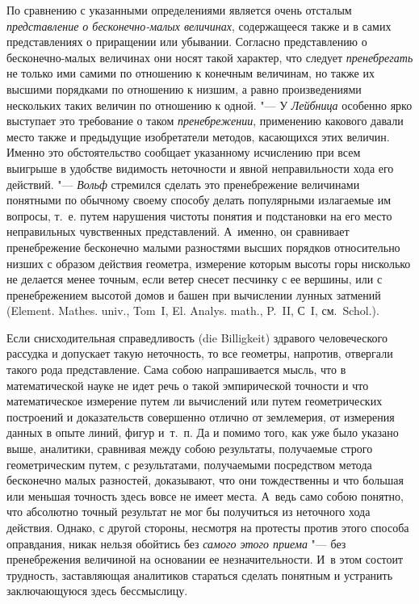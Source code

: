 По сравнению с указанными определениями является очень отсталым
{\em представление о бесконечно-малых величинах},
содержащееся также и в самих представлениях о приращении или убывании.
Согласно представлению о бесконечно-малых величинах они носят такой
характер, что следует {\em пренебрегать} не только ими
самими по отношению к конечным величинам, но также их высшими порядками по
отношению к низшим, а равно произведениями нескольких таких величин по
отношению к одной. "--- У {\em Лейбница} особенно ярко
выступает это требование о таком {\em пренебрежении},
применению какового давали место также и предыдущие изобретатели методов,
касающихся этих величин. Именно это обстоятельство сообщает указанному
исчислению при всем выигрыше в удобстве видимость неточности и явной
неправильности хода его действий. "--- {\em Вольф}
стремился сделать это пренебрежение величинами понятными по обычному своему
способу делать популярными излагаемые им вопросы, т.~е. путем нарушения
чистоты понятия и подстановки на его место неправильных чувственных
представлений. А~именно, он сравнивает пренебрежение бесконечно малыми
разностями высших порядков относительно низших с образом действия геометра,
измерение которым высоты горы нисколько не делается менее точным, если
ветер снесет песчинку с ее вершины, или с пренебрежением высотой домов и
башен при вычислении лунных затмений (Element. Mathes. univ.,
Tom~I, El. Analys. math., P.~II, С~I, см.~Schol.).

Если снисходительная справедливость (die Billigkeit) здравого человеческого
рассудка и допускает такую неточность, то все геометры, напротив, отвергали
такого рода представление. Сама собою напрашивается мысль, что в
математической науке не идет речь о такой эмпирической точности и что
математическое измерение путем ли вычислений или путем геометрических
построений и доказательств совершенно отлично от землемерия, от измерения
данных в опыте линий, фигур и~т.~п. Да и помимо того, как уже было указано
выше, аналитики, сравнивая между собою результаты, получаемые строго
геометрическим путем, с результатами, получаемыми посредством метода
бесконечно малых разностей, доказывают, что они тождественны и что большая
или меньшая точность здесь вовсе не имеет места. А~ведь само собою понятно,
что абсолютно точный результат не мог бы получиться из неточного хода
действия. Однако, с другой стороны, несмотря на протесты против этого
способа оправдания, никак нельзя обойтись без
{\em самого этого приема} "--- без пренебрежения величиной
на основании ее незначительности. И~в этом состоит трудность, заставляющая
аналитиков стараться сделать понятным и устранить заключающуюся здесь
бессмыслицу.


